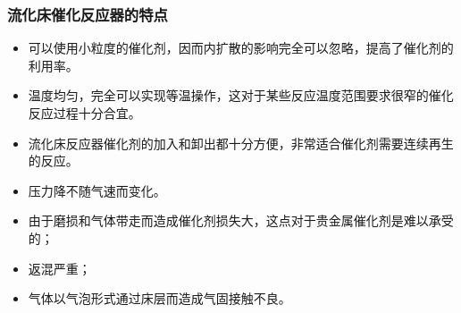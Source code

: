 \begin{frame}
    \frametitle{流化床催化反应器的特点}
    \begin{itemize}
        \item[\bigcirc] 可以使用小粒度的催化剂，因而内扩散的影响完全可以忽略，提高了催化剂的利用率。
        \item[\bigcirc] 温度均匀，完全可以实现等温操作，这对于某些反应温度范围要求很窄的催化反应过程十分合宜。
        \item[\bigcirc] 流化床反应器催化剂的加入和卸出都十分方便，非常适合催化剂需要连续再生的反应。
        \item[\bigcirc] 压力降不随气速而变化。
    \end{itemize}
    \begin{itemize}
        \item[\times] 由于磨损和气体带走而造成催化剂损失大，这点对于贵金属催化剂是难以承受的；
        \item[\times] 返混严重；
        \item[\times] 气体以气泡形式通过床层而造成气固接触不良。
    \end{itemize}
\end{frame}